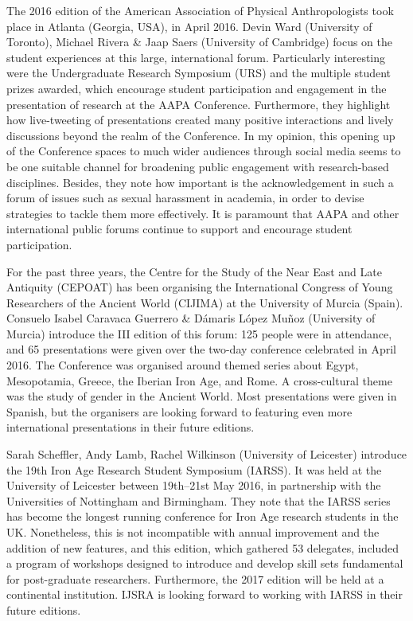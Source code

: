 \IJSRAseparator
{}
The 2016 edition of the American Association of Physical Anthropologists took place in Atlanta (Georgia, USA), in April 2016. 
Devin Ward (University of Toronto), Michael Rivera \& Jaap Saers (University of Cambridge) focus on the student experiences at this large, international forum. Particularly interesting were the Undergraduate Research Symposium (URS) and the multiple student prizes awarded, which encourage student participation and engagement in the presentation of research at the AAPA Conference. Furthermore, they highlight how live-tweeting of presentations created many positive interactions and lively discussions beyond the realm of the Conference. In my opinion, this opening up of the Conference spaces to much wider audiences through social media seems to be one suitable channel for broadening public engagement with research-based disciplines. Besides, they note how important is the acknowledgement in such a forum of issues such as sexual harassment in academia, in order to devise strategies to tackle them more effectively. It is paramount that AAPA and other international public forums continue to support and encourage student participation.

For the past three years, the Centre for the Study of the Near East and Late Antiquity (CEPOAT) has been organising the International Congress of Young Researchers of the Ancient World (CIJIMA) at the University of Murcia (Spain). Consuelo Isabel Caravaca Guerrero \& Dámaris López Muñoz (University of Murcia) introduce the III edition of this forum: 125 people were in attendance, and 65 presentations were given over the two-day conference celebrated in April 2016. The Conference was organised around themed series about Egypt, Mesopotamia, Greece, the Iberian Iron Age, and Rome. A cross-cultural theme was the study of gender in the Ancient World. Most presentations were given in Spanish, but the organisers are looking forward to featuring even more international presentations in their future editions.

Sarah Scheffler, Andy Lamb, Rachel Wilkinson (University of Leicester) introduce the 19th Iron Age Research Student Symposium (IARSS). It was held at the University of Leicester between 19th–21st May 2016, in partnership with the Universities of Nottingham and Birmingham. They note that the IARSS series has become the longest running conference for Iron Age research students in the UK. Nonetheless, this is not incompatible with annual improvement and the addition of new features, and this edition, which gathered 53 delegates, included a program of workshops designed to introduce and develop skill sets fundamental for post-graduate researchers. Furthermore, the 2017 edition will be held at a continental institution. IJSRA is looking forward to working with IARSS in their future editions.

